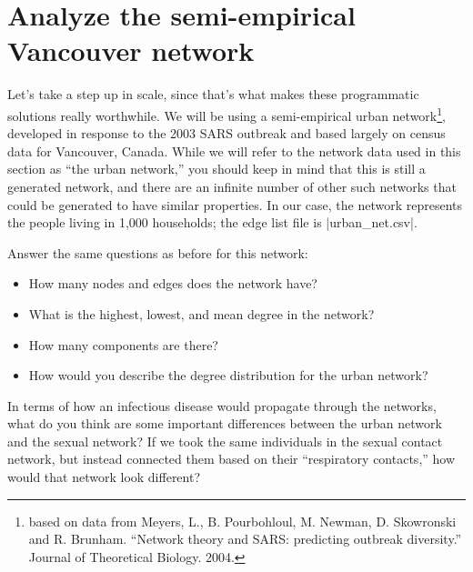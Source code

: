 \documentclass{article}
\begin{document}
\section{Analyze the semi-empirical Vancouver network}
Let's take a step up in scale, since that's what makes these programmatic solutions 
really worthwhile. We will be using a semi-empirical urban network\footnote{based on data from Meyers, L., B. Pourbohloul,
 M. Newman, D. Skowronski and R. Brunham. ``Network theory and SARS: predicting outbreak diversity.'' Journal of Theoretical Biology. 2004.},
developed in response to the 2003 SARS outbreak and based largely on census data for
Vancouver, Canada.  While we will refer to the network data used in this section
as ``the urban network,'' you should keep in mind that this is still a generated
network, and there are an infinite number of other such networks that could be
generated to have similar properties.  In our case, the network represents the
people living in 1,000 households; the edge list file is |urban_net.csv|.

Answer the same questions as before for this network:
\begin{itemize}
 \item How many nodes and edges does the network have?
 \item What is the highest, lowest, and mean degree in the network?
 \item How many components are there?
 \item How would you describe the degree distribution for the urban network?
\end{itemize}

In terms of how an infectious disease would propagate through the networks, what do you think are some important differences between 
the urban network and the sexual network? If we took the same individuals in the sexual contact network, but instead connected them based 
on their ``respiratory contacts,'' how would that network look different?
\end{document}
